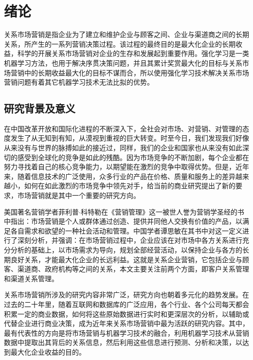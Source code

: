 \chapter{绪论}
 关系市场营销是指企业为了建立和维护企业与顾客之间、企业与渠道商之间的长期关系，所产生的一系列营销决策过程。该过程的最终目的是最大化企业的长期收益，科学的开展关系市场营销对企业的生存和发展起到重要作用。强化学习是一类机器学习方法，也用于解决序贯决策问题，并且其累计奖赏最大化的目标与关系市场营销中的长期收益最大化的目标不谋而合，所以使用强化学习技术解决关系市场营销问题有着其它机器学习技术无法比拟的优势。

\section{研究背景及意义}


在中国改革开放和国际化进程的不断深入下，全社会对市场、对营销、对管理的态度发生了从无知到有知，从漠视到重视的巨大转变。时至今日，我们发现我们好像从来没有与世界的脉搏如此的接近过，同样，我们的企业和国家也从来没有如此深切的感受到全球化的竞争是如此的残酷。因为市场竞争的不断加剧，每个企业都在努力寻找着自己的核心竞争能力，以期望能在激烈的竞争中取得优势。但是，近年来，随着信息技术的广泛使用，众多行业的产品在价格、质量和服务上的差异越来越小，如何在如此激烈的市场竞争中领先对手，给当前的商业研究提出了新的要求，市场营销就是其中一个重要的研究方向。

美国著名营销学者菲利普$\cdot$科特勒在《营销管理》\citep{菲利普2016营销管理}这一被世人誉为营销学圣经的书中指出：市场营销是个人或群体通过创造、提供并同他人交换有价值的产品，以满足各自需求和欲望的一种社会活动和管理。中国学者谭思敏在其书\citep{谭思敏2008中国式营销}中对这一定义进行了深刻分析，并强调：在市场营销过程中，企业应该在对市场中各方关系进行充分分析的基础上，以市场需求为导向，规划全部经营活动，以保持企业与各方的长期良好关系，才能最大化企业的长远利益。这就是关系企业营销，它包括企业与顾客、渠道商、政府机构等之间的关系，本文主要关注前两个方面，即客户关系管理和渠道关系管理。

关系市场营销所涉及的研究内容非常广泛，研究方向也朝着多元化的趋势发展\citep{王广宇2013客户关系管理}。在过去的二十年里，随着互联网和数据库的广泛应用，各个行业、各个公司每天都会积累一定的商业数据，如何将这些原始数据进行实时和更深层次的分析，以辅助或代替企业进行商业决策，成为近年来关系市场营销中最为活跃的研究内容。其中，最有代表性的方向是将市场营销与机器学习技术的融合，利用机器学习技术从营销数据中提取出其背后的关系信息，然后利用这些信息进行预测、分析和决策，以达到最大化企业收益的目的。



